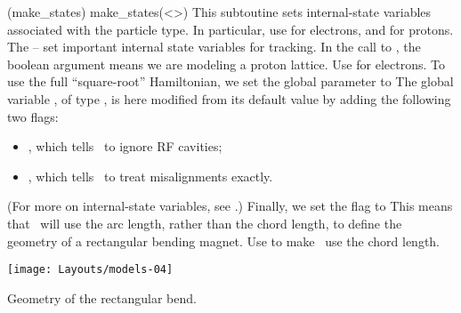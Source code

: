 %
\glossary[ptccmds](make\_states)%
  {make\_states(<\textit{}>)}%
  {This subtoutine sets internal-state variables associated
   with the particle type.
   In particular, use  for electrons,
   and  for protons.}
%
The -- set important
internal state variables for tracking. In the call to
, the boolean argument  means we are
modeling a proton lattice. Use  for electrons.%
To use the full ``square-root'' Hamiltonian, we set the global
parameter  to  The global variable
, of type , is here modified
from its default value by adding the following two flags:
\begin{itemize}
  \item {}, which tells \PTC\ to ignore RF cavities;
  \item {}, which tells \PTC\ to treat misalignments exactly.
\end{itemize}
(For more on internal-state variables, see .)
Finally, we set the flag  to  This
means that \PTC\ will use the arc length, rather than the chord
length, to define the geometry of a rectangular bending magnet.
Use  to make \PTC\ use the chord length.

\begin{marginfigure}\forcerectofloat
  \texttt{[image: Layouts/models-04]}
  \caption{Geometry of the rectangular bend.}
  \label{fig:rect.bend}
\end{marginfigure}


